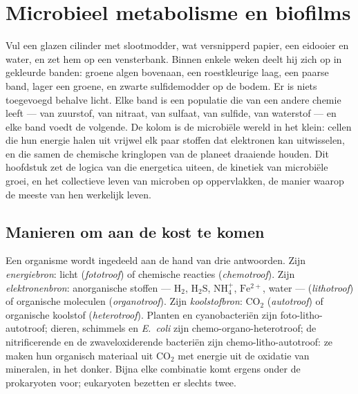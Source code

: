 \chapter{Microbieel metabolisme en biofilms}\label{ch:b2:microbial-metabolism}

Vul een glazen cilinder met slootmodder, wat versnipperd papier, een
eidooier en water, en zet hem op een vensterbank. Binnen enkele weken
deelt hij zich op in gekleurde banden: groene algen bovenaan, een
roestkleurige laag, een paarse band, lager een groene, en zwarte
sulfidemodder op de bodem. Er is niets toegevoegd behalve licht. Elke
band is een populatie die van een andere chemie leeft --- van zuurstof,
van nitraat, van sulfaat, van sulfide, van waterstof --- en elke band
voedt de volgende. De kolom is de microbiële wereld in het klein:
cellen die hun energie halen uit vrijwel elk paar stoffen dat
elektronen kan uitwisselen, en die samen de chemische kringlopen van de
planeet draaiende houden. Dit hoofdstuk zet de logica van die
energetica uiteen, de kinetiek van microbiële groei, en het collectieve
leven van microben op oppervlakken, de manier waarop de meeste van hen
werkelijk leven.

\section{Manieren om aan de kost te komen}

\begin{definition}[Voedingstypen]\label{def:b2:microbial-metabolism:trophic}
Een organisme wordt ingedeeld aan de hand van drie antwoorden. Zijn
\emph{energiebron}: licht (\emph{fototroof}) of chemische reacties
(\emph{chemotroof}). Zijn \emph{elektronenbron}: anorganische stoffen
--- $\mathrm{H_2}$, $\mathrm{H_2S}$, $\mathrm{NH_4^+}$, $\mathrm{Fe^{2+}}$,
water --- (\emph{lithotroof}) of organische moleculen
(\emph{organotroof}). Zijn \emph{koolstofbron}: $\mathrm{CO_2}$
(\emph{autotroof}) of organische koolstof (\emph{heterotroof}). Planten
en cyanobacteriën zijn foto-litho-autotroof; dieren, schimmels en
\emph{E.~coli} zijn chemo-organo-heterotroof; de nitrificerende en de
zwaveloxiderende bacteriën zijn chemo-litho-autotroof: ze maken hun
organisch materiaal uit $\mathrm{CO_2}$ met energie uit de oxidatie van
mineralen, in het donker. Bijna elke combinatie komt ergens onder de
prokaryoten voor; eukaryoten bezetten er slechts twee.
\end{definition}

